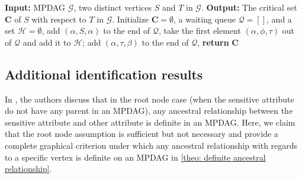 \documentclass{article} %
\begin{document}
\begin{algorithm}
\caption{Finding the critical set of $S$ with respect to $T$ in an MPDAG \cite[Algorithm 1]{zuo2022counterfactual}}
\label{alg: FindingCriticalSet}
\begin{algorithmic}[1]
\State \textbf{Input:} MPDAG $\mathcal{G}$, two distinct vertices $S$ and $T$ in $\mathcal{G}$.
\State \textbf{Output:} The critical set $\mathbf{C}$ of $S$ with respect to $T$ in $\mathcal{G}$.
\State Initialize $\mathbf{C}=\emptyset$, a waiting queue $\mathcal{Q}=[]$, and a set $\mathcal{H}=\emptyset$,
    \State add $(\alpha, S, \alpha)$ to the end of $\mathcal{Q}$,
\EndFor
{}
    \State take the first element $(\alpha, \phi, \tau)$ out of $\mathcal{Q}$ and add it to $\mathcal{H}$;
    \Else
                        \State add $(\alpha, \tau, \beta)$ to the end of $\mathcal{Q}$,
                        \EndIf
                    \EndIf
                \EndIf
            \EndIf
        \EndFor
    \EndIf
\EndWhile
\State \textbf{return} $\mathbf{C}$
\end{algorithmic}
\end{algorithm}


\subsection{Additional identification results}

In \citet{zuo2022counterfactual}, the authors discuss that in the root node case (when the sensitive attribute do not have any parent in an MPDAG), any ancestral relationship between the sensitive attribute and other attribute is definite in an MPDAG. Here, we claim that the root node assumption is sufficient but not necessary and provide a complete graphical criterion under which any ancestral relationship with regards to a specific vertex is definite on an MPDAG in \cref{theo: definite ancestral relationship}.  
\end{document}
